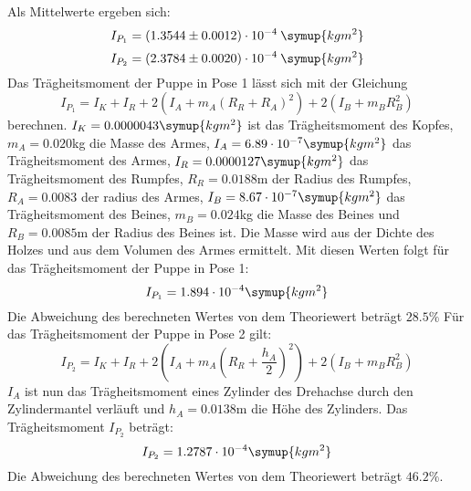 Als Mittelwerte ergeben sich:
\begin{equation}
  I_{P_1} = (1.3544 \pm 0.0012)\cdot 10^{-4}\: \symup{kgm^2}
\end{equation}
\begin{equation}
  I_{P_2} = (2.3784 \pm 0.0020)\cdot 10^{-4}\: \symup{kgm^2}
\end{equation}
Das Trägheitsmoment der Puppe in Pose 1 lässt sich mit der Gleichung
\begin{equation}
  I_{P_1} = I_K + I_R + 2(I_A + m_A(R_R + R_A)^2) + 2(I_B + m_B R_B^2)
\end{equation}
berechnen. $I_K = 0.0000043 \symup{kgm^2}$ ist das Trägheitsmoment des Kopfes,
$m_A= 0.020$kg die Masse des Armes,
$I_A= 6.89 \cdot 10^{-7}\symup{kgm^2}$  das Trägheitsmoment des Armes, $I_R = 0.0000127 \symup{kgm^2}$ das Trägheitsmoment des Rumpfes,
$R_R = 0.0188$m der Radius des Rumpfes, $R_A = 0.0083$ der radius des Armes, $I_B = 8.67 \cdot 10^{-7} \symup{kgm^2}$ das Trägheitsmoment des Beines,
$m_B = 0.024$kg die Masse des Beines und $R_B = 0.0085$m der Radius des Beines ist.
Die Masse wird aus der Dichte des Holzes und aus dem Volumen des Armes ermittelt.
Mit diesen Werten folgt für das Trägheitsmoment der Puppe in Pose 1:
\begin{equation}
I_{P_1} = 1.894 \cdot 10^{-4} \symup{kgm^2}
\end{equation}
Die Abweichung des berechneten Wertes von dem Theoriewert beträgt $28.5\%$
Für das Trägheitsmoment der Puppe in Pose 2 gilt:
\begin{equation}
  I_{P_2} = I_K + I_R + 2(I_A + m_A(R_R + \frac{h_A}{2})^2) + 2(I_B + m_B R_B^2)
\end{equation}
$I_A$ ist nun das Trägheitsmoment eines Zylinder des Drehachse durch den Zylindermantel
verläuft und $h_A= 0.0138$m die Höhe des Zylinders.
Das Trägheitsmoment $I_{P_2}$ beträgt:
\begin{equation}
  I_{P_2} = 1.2787 \cdot 10^{-4} \symup{kgm^2}
\end{equation}
Die Abweichung des berechneten Wertes von dem Theoriewert beträgt $46.2 \%$.
